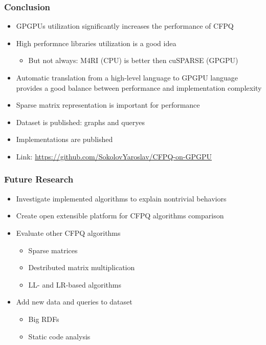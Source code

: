 \documentclass[xcolor=table]{beamer}
\begin{document}
\begin{frame}[fragile] \frametitle{Conclusion}
  \begin{itemize}
    \item GPGPUs utilization significantly increases the performance of CFPQ
    \pause
    \item High performnce libraries utilization is a good idea
    \begin{itemize}
      \item But not always: M4RI (CPU) is better then cuSPARSE (GPGPU)
    \end{itemize}
    \pause
    \item Automatic translation from a high-level language to GPGPU language provides a good balance between performance and implementation complexity
    \pause
    \item Sparse matrix representation is important for performance %
  \end{itemize}
  \pause
  \begin{itemize}
    \item Dataset is published: graphs and queryes
    \item Implementations are published
    \item Link: \url{https://github.com/SokolovYaroslav/CFPQ-on-GPGPU}
  \end{itemize}
\end{frame}

\begin{frame}[fragile] \frametitle{Future Research}
  \begin{itemize}
    \item Investigate implemented algorithms to explain nontrivial behaviors
    \item Create open extensible platform for CFPQ algorithms comparison
    \item Evaluate other CFPQ algorithms
    \begin{itemize}
      \item Sparse matrices
      \item Destributed matrix multiplication
      \item LL- and LR-based algorithms
    \end{itemize}
    \item Add new data and queries to dataset
    \begin{itemize}
      \item Big RDFs
      \item Static code analysis
    \end{itemize}
  \end{itemize}
\end{frame}
\end{document}
